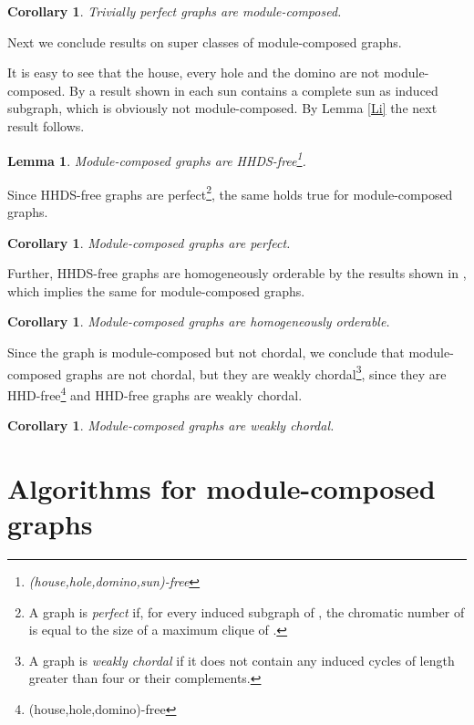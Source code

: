 \documentclass[11pt]{article}
\newtheorem{corollary}[theorem]{Corollary}
\newtheorem{lemma}[theorem]{Lemma}
\begin{document}
\begin{corollary}
Trivially perfect graphs are module-composed.
\end{corollary}






Next we conclude results on super classes
of module-composed graphs.

It is easy to see that the house, every hole and the domino are not module-composed.
By a result shown in \cite{Far83} each sun contains a complete sun as induced subgraph, which
is obviously not module-composed. By  Lemma \ref{Li} the next result follows.  


\begin{lemma}
Module-composed graphs are HHDS-free\footnote{(house,hole,domino,sun)-free}.
\end{lemma}


Since HHDS-free graphs are perfect\footnote{A graph  is {\em perfect} if, for every induced subgraph  of , the chromatic number of  is equal to the size of a maximum clique of .}, the same holds true for module-composed graphs.

\begin{corollary}
Module-composed graphs are perfect.
\end{corollary}

Further, HHDS-free graphs are homogeneously orderable  by the results shown in \cite{BDN97}, which implies the same for module-composed graphs.

\begin{corollary}
Module-composed graphs are homogeneously orderable.
\end{corollary}


Since the graph  is module-composed but not chordal, we conclude that 
module-composed graphs are not chordal, but they are weakly chordal\footnote{A graph is {\em weakly chordal} if it does not 
contain any induced cycles of length greater than four or their complements.}, since they
are HHD-free\footnote{(house,hole,domino)-free} and HHD-free graphs are weakly chordal.




\begin{corollary}
Module-composed graphs are weakly chordal.
\end{corollary}




\section{Algorithms for module-composed graphs}
\end{document}
